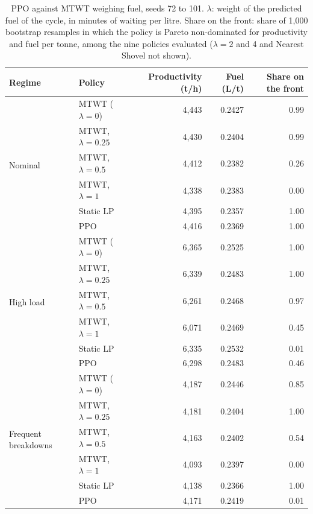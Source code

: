 \documentclass[11pt,a4paper]{article}
\newif\ifrevmarks
\newcommand{\revtag}[1]{\ifrevmarks\textsuperscript{\textcolor{red!70!black}{\scriptsize[#1]}}\fi}
\newenvironment{revbloc}[1]{\par\ifrevmarks\color{revcolor}\noindent\revtag{#1}\ \fi}{\par}
\newif\ifcorrmarks
\newcommand{\corr}[1]{\ifcorrmarks\textcolor{corrcolor}{#1}\else#1\fi}
\newenvironment{corrbloc}{\par\ifcorrmarks\color{corrcolor}\fi}{\par}
\begin{document}
\begin{revbloc}{T31}
\begin{corrbloc}
\begin{table}[H]
\centering
\caption{PPO against MTWT weighing fuel, seeds 72 to 101. $\lambda$: weight of the predicted fuel of the cycle, in minutes of waiting per litre. Share on the front: share of 1,000 bootstrap resamples in which the policy is Pareto non-dominated for productivity and fuel per tonne, among the nine policies evaluated ($\lambda = 2$ and 4 and Nearest Shovel not shown).}
\label{tab:energy}
\small
\begin{tabular}{@{}llrrr@{}}
\toprule
\textbf{Regime} & \textbf{Policy} & \textbf{Productivity (t/h)} & \textbf{Fuel (L/t)} & \textbf{Share on the front} \\
\midrule
\multirow{6}{*}{Nominal} & MTWT ($\lambda = 0$) & 4{,}443 & 0.2427 & 0.99 \\
 & MTWT, $\lambda = 0.25$ & 4{,}430 & 0.2404 & 0.99 \\
 & MTWT, $\lambda = 0.5$ & 4{,}412 & 0.2382 & 0.26 \\
 & MTWT, $\lambda = 1$ & 4{,}338 & 0.2383 & 0.00 \\
 & \corr{Static LP} & 4{,}395 & 0.2357 & 1.00 \\
 & PPO & 4{,}416 & 0.2369 & 1.00 \\
\midrule
\multirow{6}{*}{High load} & MTWT ($\lambda = 0$) & 6{,}365 & 0.2525 & 1.00 \\
 & MTWT, $\lambda = 0.25$ & 6{,}339 & 0.2483 & 1.00 \\
 & MTWT, $\lambda = 0.5$ & 6{,}261 & 0.2468 & 0.97 \\
 & MTWT, $\lambda = 1$ & 6{,}071 & 0.2469 & 0.45 \\
 & \corr{Static LP} & 6{,}335 & 0.2532 & 0.01 \\
 & PPO & 6{,}298 & 0.2483 & 0.46 \\
\midrule
\multirow{6}{*}{Frequent breakdowns} & MTWT ($\lambda = 0$) & 4{,}187 & 0.2446 & 0.85 \\
 & MTWT, $\lambda = 0.25$ & 4{,}181 & 0.2404 & 1.00 \\
 & MTWT, $\lambda = 0.5$ & 4{,}163 & 0.2402 & 0.54 \\
 & MTWT, $\lambda = 1$ & 4{,}093 & 0.2397 & 0.00 \\
 & \corr{Static LP} & 4{,}138 & 0.2366 & 1.00 \\
 & PPO & 4{,}171 & 0.2419 & 0.01 \\
\bottomrule
\end{tabular}
\end{table}
\end{corrbloc}
\end{revbloc}
\end{document}
